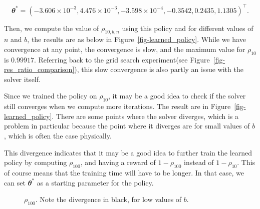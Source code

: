 \documentclass[
  letterpaper,
]{report}
\theoremstyle{definition}
\theoremstyle{plain}
\theoremstyle{definition}
\theoremstyle{remark}
\begin{document}
\[
\mathbfit{\theta}^* = (-3.606 \times 10^{-3},4.476\times 10^{-3},-3.598\times 10^{-4},-0.3542 ,0.2435,1.1305)^\intercal.
\]

Then, we compute the value of \(\rho_{10,b,n}\) using this policy and
for different values of \(n\) and \(b\), the results are as below in
Figure~\ref{fig-learned_policy}. While we have convergence at any point,
the convergence is slow, and the maximum value for \(\rho_{10}\) is
\(0.99917\). Referring back to the grid search experiment(see
Figure~\ref{fig-res_ratio_comparison}), this slow convergence is also
partly an issue with the solver itself.

Since we trained the policy on \(\rho_{10}\), it may be a good idea to
check if the solver still converges when we compute more iterations. The
result are in Figure~\ref{fig-learned_policy}. There are some points
where the solver diverges, which is a problem in particular because the
point where it diverges are for small values of \(b\), which is often
the case physically.

This divergence indicates that it may be a good idea to further train
the learned policy by computing \(\rho_{100}\), and having a reward of
\(1-\rho_{100}\) instead of \(1-\rho_{10}\). This of course means that
the training time will have to be longer. In that case, we can set
\(\mathbfit{\theta}^*\) as a starting parameter for the policy.

\begin{figure}


\caption{\label{fig-learned\_policy\_b}\(\rho_{100}\). Note the
divergence in black, for low values of \(b\).}

\end{figure}%
\end{document}
